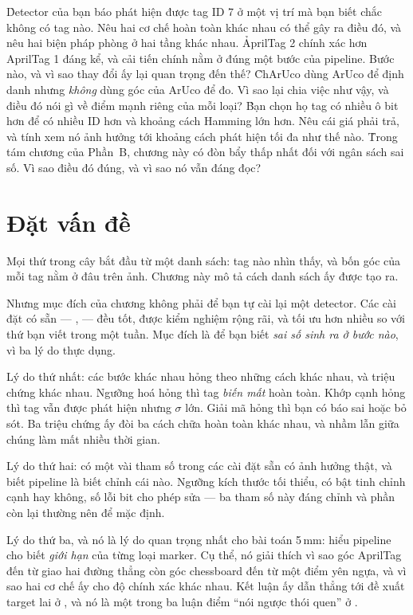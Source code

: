 \documentclass[../../marker.tex]{subfiles}
\begin{document}
\begin{khoigoi}
\h{Detector của bạn báo phát hiện được tag ID 7 ở một vị trí mà bạn biết chắc không có tag nào. Nêu hai cơ chế hoàn toàn khác nhau có thể gây ra điều đó, và nêu hai biện pháp phòng ở hai tầng khác nhau.}
\h{AprilTag 2 chính xác hơn AprilTag 1 đáng kể, và cải tiến chính nằm ở đúng một bước của pipeline. Bước nào, và vì sao thay đổi ấy lại quan trọng đến thế?}
\h{ChArUco dùng ArUco để định danh nhưng \emph{không} dùng góc của ArUco để đo. Vì sao lại chia việc như vậy, và điều đó nói gì về điểm mạnh riêng của mỗi loại?}
\h{Bạn chọn họ tag có nhiều ô bit hơn để có nhiều ID hơn và khoảng cách Hamming lớn hơn. Nêu cái giá phải trả, và tính xem nó ảnh hưởng tới khoảng cách phát hiện tối đa như thế nào.}
\h{Trong tám chương của Phần~B, chương này có đòn bẩy thấp nhất đối với ngân sách sai số. Vì sao điều đó đúng, và vì sao nó vẫn đáng đọc?}
\end{khoigoi}

\section{Đặt vấn đề}

Mọi thứ trong cây bắt đầu từ một danh sách: tag nào nhìn thấy, và bốn góc của mỗi tag nằm ở đâu trên ảnh. Chương này mô tả cách danh sách ấy được tạo ra.

Nhưng mục đích của chương không phải để bạn tự cài lại một detector. Các cài đặt có sẵn --- ,   --- đều tốt, được kiểm nghiệm rộng rãi, và tối ưu hơn nhiều so với thứ bạn viết trong một tuần. Mục đích là để bạn biết \emph{sai số sinh ra ở bước nào}, vì ba lý do thực dụng.

Lý do thứ nhất: các bước khác nhau hỏng theo những cách khác nhau, và triệu chứng khác nhau. Ngưỡng hoá hỏng thì tag \emph{biến mất} hoàn toàn. Khớp cạnh hỏng thì tag vẫn được phát hiện nhưng \(\sigma\) lớn. Giải mã hỏng thì bạn có báo sai hoặc bỏ sót. Ba triệu chứng ấy đòi ba cách chữa hoàn toàn khác nhau, và nhầm lẫn giữa chúng làm mất nhiều thời gian.

Lý do thứ hai: có một vài tham số trong các cài đặt sẵn có ảnh hưởng thật, và biết pipeline là biết chỉnh cái nào. Ngưỡng kích thước tối thiểu, có bật tinh chỉnh cạnh hay không, số lỗi bit cho phép sửa --- ba tham số này đáng chỉnh và phần còn lại thường nên để mặc định.

Lý do thứ ba, và nó là lý do quan trọng nhất cho bài toán 5\,mm: hiểu pipeline cho biết \emph{giới hạn} của từng loại marker. Cụ thể, nó giải thích vì sao góc AprilTag đến từ giao hai đường thẳng còn góc chessboard đến từ một điểm yên ngựa, và vì sao hai cơ chế ấy cho độ chính xác khác nhau. Kết luận ấy dẫn thẳng tới đề xuất target lai ở , và nó là một trong ba luận điểm ``nói ngược thói quen'' ở .
\end{document}
